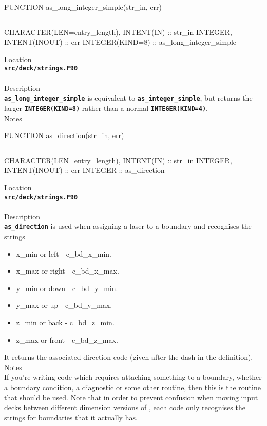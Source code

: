\documentclass[12pt,a4paper]{article}
\newcommand{\HRule}{\rule[0.3cm]{\linewidth}{0.5mm}}
\newcommand{\inlinecode}[1]{{\color{warwickred} \bf\texttt{#1}}}
\newcommand{\EPOCH}{{\color{warwickdark}\fontfamily{phv}\selectfont{EPOCH}}}
\begin{document}
\pagebreak
\begin{codedef}
FUNCTION as_long_integer_simple(str_in, err)
\HRule
CHARACTER(LEN=entry_length), INTENT(IN) :: str_in
INTEGER, INTENT(INOUT) :: err
INTEGER(KIND=8) :: as_long_integer_simple
\end{codedef}
\vspace{1cm}
{\Large Location\\}
\inlinecode{src/deck/strings.F90}\\
\\[0.5cm]
{\Large Description\\}
\inlinecode{as\_long\_integer\_simple} is equivalent to
\inlinecode{as\_integer\_simple}, but returns the larger
\inlinecode{INTEGER(KIND=8)} rather than a normal \inlinecode{INTEGER(KIND=4)}.
\\[0.5cm]
{\Large Notes\\}

\pagebreak
\begin{codedef}
FUNCTION as_direction(str_in, err)
\HRule
CHARACTER(LEN=entry_length), INTENT(IN) :: str_in
INTEGER, INTENT(INOUT) :: err
INTEGER :: as_direction
\end{codedef}
\vspace{1cm}
{\Large Location\\}
\inlinecode{src/deck/strings.F90}\\
\\[0.5cm]
{\Large Description\\}
\inlinecode{as\_direction} is used when assigning a laser to a boundary and
recognises the strings
\begin{itemize}
\item x\_min or left - c\_bd\_x\_min.
\item x\_max or right - c\_bd\_x\_max.
\item y\_min or down - c\_bd\_y\_min.
\item y\_max or up - c\_bd\_y\_max.
\item z\_min or back - c\_bd\_z\_min.
\item z\_max or front - c\_bd\_z\_max.
\end{itemize}
It returns the associated direction code (given after the dash in the
definition).
\\[0.5cm]
{\Large Notes\\}
If you're writing code which requires attaching something to a boundary,
whether a boundary condition, a diagnostic or some other routine, then this is
the routine that should be used. Note that in order to prevent confusion when
moving input decks between different dimension versions of {\EPOCH}, each code
only recognises the strings for boundaries that it actually has.
\end{document}
